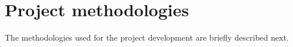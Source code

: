 \section{Project methodologies}
The methodologies used for the project development are briefly described next.
%

